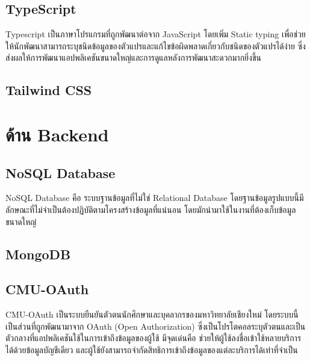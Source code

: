 \subsection{TypeScript}
Typescript เป็นภาษาโปรแกรมที่ถูกพัฒนาต่อจาก JavaScript โดยเพิ่ม Static typing เพื่อช่วยให้นักพัฒนาสามารถระบุชนิดข้อมูลของตัวแปรและแก้ไขข้อผิดพลาดเกี่ยวกับชนิดของตัวแปรได้ง่าย ซึ่งส่งผลให้การพัฒนาแอปพลิเคชันขนาดใหญ่และการดูแลหลังการพัฒนาสะดวกมากยิ่งขึ้น \cite{typescript}
\subsection{Tailwind CSS}

\section{ด้าน Backend}
\subsection{NoSQL Database}
NoSQL Database คือ ระบบฐานข้อมูลที่ไม่ใช่ Relational Database โดยฐานข้อมูลรูปแบบนี้มีลักษณะที่ไม่จำเป็นต้องปฏิบัติตามโครงสร้างข้อมูลที่แน่นอน โดยมักนำมาใช้ในงานที่ต้องเก็บข้อมูลขนาดใหญ่
\cite{nosql}
\subsection{MongoDB}

\cite{firebase}
\subsection{CMU-OAuth}
CMU-OAuth เป็นระบบยืนยันตัวตนนักศึกษาและบุคลากรของมหาวิทยาลัยเชียงใหม่ โดยระบบนี้เป็นส่วนที่ถูกพัฒนามาจาก OAuth (Open Authorization) ซึ่งเป็นโปรโตคอลระบุตัวตนและเป็นตัวกลางที่แอปพลิเคชันใช้ในการเข้าถึงข้อมูลของผู้ใช้ มีจุดเด่นคือ ช่วยให้ผู้ใช้ลงชื่อเข้าใช้หลายบริการ
ได้ด้วยข้อมูลบัญชีเดียว และผู้ใช้ยังสามารถจำกัดสิทธิการเข้าถึงข้อมูลของแต่ละบริการได้เท่าที่จำเป็น
\cite{oauth}
